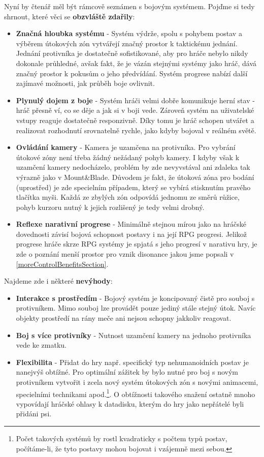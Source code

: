 Nyní by čtenář měl být rámcově seznámen s bojovým systémem. Pojďme si tedy shrnout, které věci se \textbf{obzvláště zdařily}:

\begin{itemize}
    \item \textbf{Značná hloubka systému} - Systém výdrže, spolu s pohybem postav a výběrem útokových zón vytvářejí značný prostor k taktickému jednání. Jednání protivníka je dostatečně sofistikované, aby pro hráče nebylo nikdy dokonale průhledné, avšak fakt, že je vázán stejnými systémy jako hráč, dává značný prostor k pokusům o jeho předvídání. Systém progrese nabízí další zajímavé možnosti, jak průběh boje ovlivnit. 
    \item \textbf{Plynulý dojem z boje} - Systém hráči velmi dobře komunikuje herní stav - hráč přesně ví, co se děje a jak si v boji vede. Zároveň systém na uživatelské vstupy reaguje dostatečně responzivně. Díky tomu je hráč schopen utvářet a realizovat rozhodnutí srovnatelně rychle, jako kdyby bojoval v reálném světě.
    \item \textbf{Ovládání kamery} - Kamera je uzamčena na protivníka. Pro vybrání útokové zóny není třeba žádný nežádaný pohyb kamery. I kdyby však k uzamčení kamery nedocházelo, problém by zde nevyvstával ani zdaleka tak výrazně jako v Mount\&Blade. Důvodem je fakt, že útoková zóna pro bodání (uprostřed) je zde specielním případem, který se vybírá stisknutím pravého tlačítka myši. Každá ze zbylých zón odpovídá jednomu ze směrů růžice, pohyb kurzoru nutný k jejich rozlišený je tedy velmi drobný. 
    \item \textbf{Reflexe narativní progrese} - Minimálně stejnou mírou jako na hráčské dovednosti závisí bojová schopnost postavy i na její \acs{RPG} progresi. Jelikož progrese hráče skrze \acs{RPG} systémy je spjatá s jeho progresí v narativu hry, je zde o poznání menší prostor pro vznik disonance jakou jsme popsali v \ref{moreControlBenefitsSection}.
\end{itemize}

Najdeme zde i některé \textbf{nevýhody}:
\begin{itemize}
    \item \textbf{Interakce s prostředím} - Bojový systém je koncipovaný čistě pro souboj s protivníkem. Mimo souboj lze provádět pouze jediný stále stejný útok. Navíc objekty prostředí na rány meče ani nejsou schopny jakkoliv reagovat.  
    \item \textbf{Boj s více protivníky} - Nutnost uzamčení kamery na jednoho protivníka vede ke zmatku.
    \item \textbf{Flexibilita} - Přidat do hry např. specifický typ nehumanoidních postav je nanejvýš obtížné. Pro optimální zážitek by bylo nutné pro boj s novým protivníkem vytvořit i zcela nový systém útokových zón s novými animacemi, specielními technikami apod.\footnote{Počet takových systémů by rostl kvadraticky s počtem typů postav, počítáme-li, že tyto postavy mohou bojovat i vzájemně mezi sebou.}. O obtížnosti takového snažení ostatně mnoho vypovídají hráčské ohlasy k datadisku, kterým do hry jako nepřátelé byli přidáni psi.  
\end{itemize}

